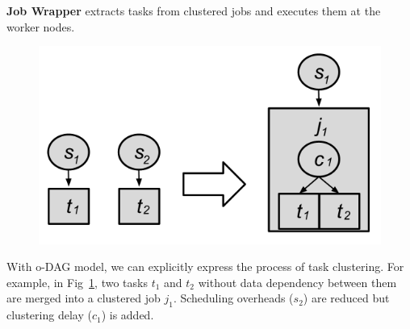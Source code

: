 \textbf{Job Wrapper} extracts tasks from clustered jobs and executes them at the worker nodes. 


\begin{figure}[h!]
\centering
 \includegraphics[width=0.6\linewidth]{figures/introduction/hc.png}
  \label{fig:intro_hc}
\end{figure}



With o-DAG model, we can explicitly express the process of task clustering. For example, in Fig~\ref{fig:intro_hc}, two tasks $t_1$ and $t_2$ without data dependency between them are merged into a clustered job $j_1$. Scheduling overheads ($s_2$) are reduced but clustering delay ($c_1$) is added. 




